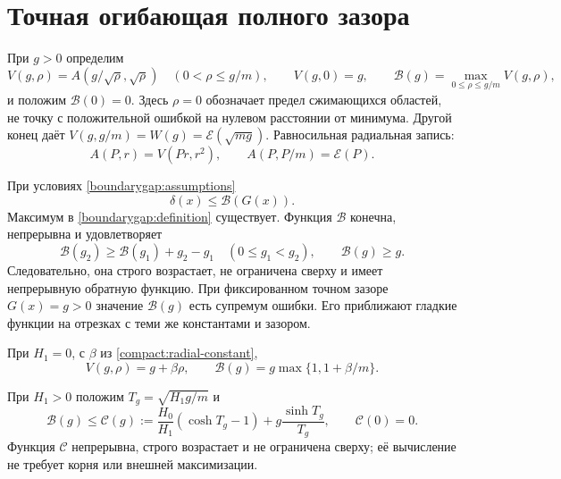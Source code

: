 \section{Точная огибающая полного зазора}
\label{boundarygap:section}
При $g>0$ определим
\begin{equation}\label{boundarygap:definition}
 V(g,\rho)=A(g/\sqrt\rho,\sqrt\rho)\quad(0<\rho\le g/m),
 \qquad V(g,0)=g,\qquad
 \mathcal B(g)=\max_{0\le\rho\le g/m}V(g,\rho),
\end{equation}
и положим $\mathcal B(0)=0$.
Здесь $\rho=0$ обозначает предел сжимающихся областей, не точку
с положительной ошибкой на нулевом расстоянии от минимума.
Другой конец даёт $V(g,g/m)=W(g)=\mathcal E(\sqrt{mg})$.
Равносильная радиальная запись:
\begin{equation}\label{joint:radial-identity}
 A(P,r)=V(Pr,r^2),\qquad A(P,P/m)=\mathcal E(P).
\end{equation}

\begin{theorem}
\label{boundarygap:main}
При условиях \eqref{boundarygap:assumptions}
\[
 \delta(x)\le\mathcal B(G(x)).
\]
Максимум в \eqref{boundarygap:definition} существует.
Функция $\mathcal B$ конечна, непрерывна и удовлетворяет
\begin{equation}\label{boundarygap:growth}
 \mathcal B(g_2)\ge\mathcal B(g_1)+g_2-g_1
 \quad(0\le g_1<g_2),\qquad \mathcal B(g)\ge g.
\end{equation}
Следовательно, она строго возрастает, не ограничена сверху
и имеет непрерывную обратную функцию.
При фиксированном точном зазоре $G(x)=g>0$ значение
$\mathcal B(g)$ есть супремум ошибки. Его приближают гладкие
функции на отрезках с теми же константами и зазором.

При $H_1=0$, с $\beta$ из \eqref{compact:radial-constant},
\begin{equation}\label{boundarygap:constant}
 V(g,\rho)=g+\beta\rho,\qquad
 \mathcal B(g)=g\max\{1,1+\beta/m\}.
\end{equation}

При $H_1>0$ положим $T_g=\sqrt{H_1g/m}$ и
\begin{equation}\label{boundarygap:elementary-formula}
 \mathcal B(g)\le\mathcal C(g):=
 \frac{H_0}{H_1}(\cosh T_g-1)+g\frac{\sinh T_g}{T_g},
 \qquad\mathcal C(0)=0.
\end{equation}
Функция $\mathcal C$ непрерывна, строго возрастает и не ограничена
сверху; её вычисление не требует корня или внешней максимизации.
\end{theorem}

